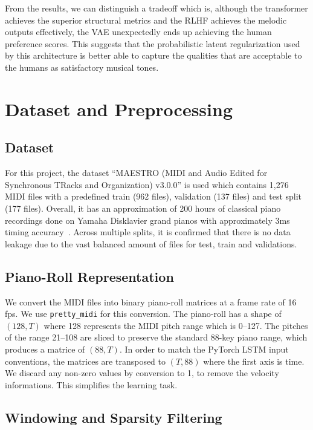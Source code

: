 \documentclass[conference]{IEEEtran}
\begin{document}
From the results, we can distinguish a tradeoff which is, although the transformer achieves the superior structural metrics and the RLHF achieves the melodic outputs effectively, the VAE unexpectedly ends up achieving the human preference scores. This suggests that the probabilistic latent regularization used by this architecture is better able to capture the qualities that are acceptable to the humans as satisfactory musical tones.

\section{Dataset and Preprocessing}

\subsection{Dataset}

For this project, the dataset ``MAESTRO (MIDI and Audio Edited for Synchronous TRacks and Organization) v3.0.0'' is used which contains 1,276 MIDI files with a predefined train (962 files), validation (137 files) and test split (177 files). Overall, it has an approximation of 200 hours of classical piano recordings done on Yamaha Disklavier grand pianos with approximately 3ms timing accuracy~\cite{ref6}. Across multiple splits, it is confirmed that there is no data leakage due to the vast balanced amount of files for test, train and validations.

\subsection{Piano-Roll Representation}

We convert the MIDI files into binary piano-roll matrices at a frame rate of 16 fps. We use \texttt{pretty\_midi} for this conversion. The piano-roll has a shape of $(128, T)$ where 128 represents the MIDI pitch range which is 0--127. The pitches of the range 21--108 are sliced to preserve the standard 88-key piano range, which produces a matrice of $(88, T)$. In order to match the PyTorch LSTM input conventions, the matrices are transposed to $(T, 88)$ where the first axis is time. We discard any non-zero values by conversion to 1, to remove the velocity informations. This simplifies the learning task.

\subsection{Windowing and Sparsity Filtering}
\end{document}
